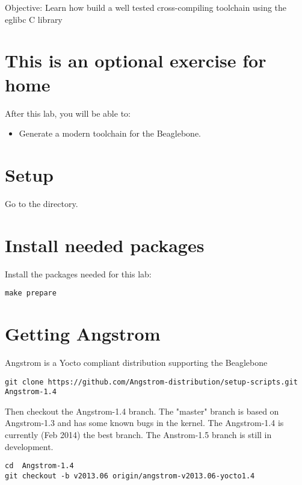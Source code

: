   {Objective: Learn how build a well tested cross-compiling toolchain using the eglibc C
  library}

\section{This is an optional exercise for home}

After this lab, you will be able to:

\begin{itemize}
\item Generate a modern toolchain for the Beaglebone.
\end{itemize}

\section{Setup}

Go to the \labdir directory.

\section{Install needed packages}

Install the packages needed for this lab:

\begin{verbatim}
make prepare
\end{verbatim}

\section{Getting Angstrom}

Angstrom is a Yocto compliant distribution supporting the Beaglebone

\begin{verbatim}
git clone https://github.com/Angstrom-distribution/setup-scripts.git	Angstrom-1.4
\end{verbatim}

Then checkout the Angstrom-1.4 branch.
The "master" branch is based on Angstrom-1.3 and has some known bugs in the kernel.
The Angstrom-1.4 is currently (Feb 2014) the best branch.
The Anstrom-1.5 branch is still in development.

\begin{verbatim}
cd	Angstrom-1.4
git checkout -b v2013.06 origin/angstrom-v2013.06-yocto1.4
\end{verbatim}

